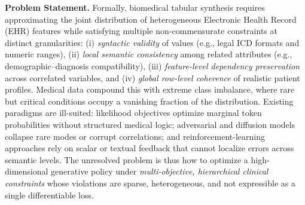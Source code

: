\noindent \textbf{Problem Statement.}
Formally, biomedical tabular synthesis requires approximating the joint distribution of heterogeneous Electronic Health Record (EHR) features while satisfying multiple non-commensurate constraints at distinct granularities: (i) \emph{syntactic validity} of values (e.g., legal ICD formats and numeric ranges), (ii) \emph{local semantic consistency} among related attributes (e.g., demographic--diagnosis compatibility), (iii) \emph{feature-level dependency preservation} across correlated variables, and (iv) \emph{global row-level coherence} of realistic patient profiles. Medical data compound this with extreme class imbalance, where rare but critical conditions occupy a vanishing fraction of the distribution. Existing paradigms are ill-suited: likelihood objectives optimize marginal token probabilities without structured medical logic; adversarial and diffusion models collapse rare modes or corrupt correlations; and reinforcement-learning approaches rely on scalar or textual feedback that cannot localize errors across semantic levels. The unresolved problem is thus how to optimize a high-dimensional generative policy under \emph{multi-objective, hierarchical clinical constraints} whose violations are sparse, heterogeneous, and not expressible as a single differentiable loss.






